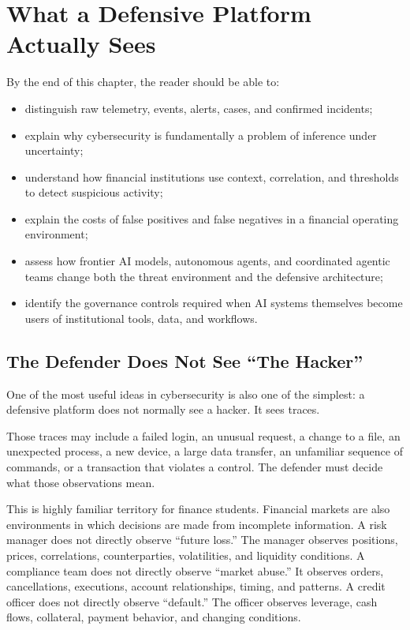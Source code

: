 \chapter{What a Defensive Platform Actually Sees}

\begin{learningobjectives}
By the end of this chapter, the reader should be able to:
\begin{itemize}
    \item distinguish raw telemetry, events, alerts, cases, and confirmed incidents;
    \item explain why cybersecurity is fundamentally a problem of inference under uncertainty;
    \item understand how financial institutions use context, correlation, and thresholds to detect suspicious activity;
    \item explain the costs of false positives and false negatives in a financial operating environment;
    \item assess how frontier AI models, autonomous agents, and coordinated agentic teams change both the threat environment and the defensive architecture;
    \item identify the governance controls required when AI systems themselves become users of institutional tools, data, and workflows.
\end{itemize}
\end{learningobjectives}

\section{The Defender Does Not See ``The Hacker''}

One of the most useful ideas in cybersecurity is also one of the simplest: a defensive platform does not normally see a hacker. It sees traces.

Those traces may include a failed login, an unusual request, a change to a file, an unexpected process, a new device, a large data transfer, an unfamiliar sequence of commands, or a transaction that violates a control. The defender must decide what those observations mean.

This is highly familiar territory for finance students. Financial markets are also environments in which decisions are made from incomplete information. A risk manager does not directly observe ``future loss.'' The manager observes positions, prices, correlations, counterparties, volatilities, and liquidity conditions. A compliance team does not directly observe ``market abuse.'' It observes orders, cancellations, executions, account relationships, timing, and patterns. A credit officer does not directly observe ``default.'' The officer observes leverage, cash flows, collateral, payment behavior, and changing conditions.

